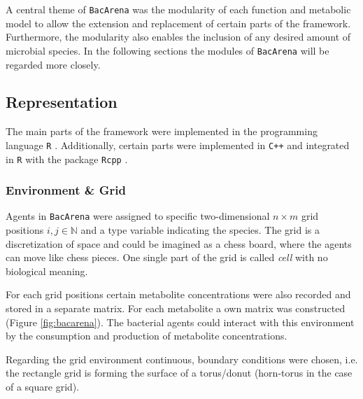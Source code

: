 A central theme of \texttt{BacArena} was the modularity of each function and metabolic model to allow the extension and replacement of certain parts of the framework. Furthermore, the modularity also enables the inclusion of any desired amount of microbial species. In the following sections the modules of \texttt{BacArena} will be regarded more closely. 

\subsection{Representation}
The main parts of the framework were implemented in the programming language \texttt{R} \cite{R12}. Additionally, certain parts were implemented in \texttt{C++} and integrated in \texttt{R} with the package \texttt{Rcpp} \cite{dirk}.

\subsubsection{Environment \& Grid}
Agents in \texttt{BacArena} were assigned to specific two-dimensional $n \times m$ grid positions $i, j \in \mathbb{N}$ and a type variable indicating the species. The grid is a discretization of space and could be imagined as a chess board, where the agents can move like chess pieces. 
One single part of the grid is called \textit{cell} with no biological meaning.

For each grid positions certain metabolite concentrations were also recorded and stored in a separate matrix. For each metabolite a own matrix was constructed (Figure \hyperref[fig:bacarena]{\ref{fig:bacarena}}). The bacterial agents could interact with this environment by the consumption and production of metabolite concentrations.

Regarding the grid environment continuous, boundary conditions were chosen, i.e. the rectangle grid is forming the surface of a torus/donut (horn-torus in the case of a square grid).

